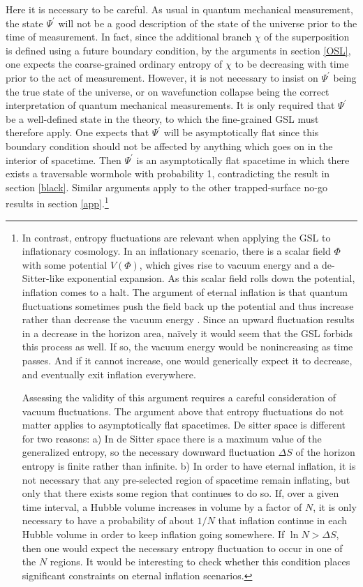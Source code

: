 \documentclass{article}
\begin{document}
Here it is necessary to be careful.  As usual in quantum mechanical measurement, the state $\Psi^\prime$ will not be a good description of the state of the universe prior to the time of measurement.  In fact, since the additional branch $\chi$ of the superposition is defined using a future boundary condition, by the arguments in section \ref{OSL}, one expects the coarse-grained ordinary entropy of $\chi$ to be decreasing with time prior to the act of measurement.  However, it is not necessary to insist on $\Psi^\prime$ being the true state of the universe, or on wavefunction collapse being the correct interpretation of quantum mechanical measurements.  It is only required that $\Psi^\prime$ be a well-defined state in the theory, to which the fine-grained GSL must therefore apply.  One expects that $\Psi^\prime$ will be asymptotically flat since this boundary condition should not be affected by anything which goes on in the interior of spacetime.  Then 
$\Psi^\prime$ is an asymptotically flat spacetime in which there exists a traversable wormhole with probability 1, contradicting the result in section \ref{black}.  Similar arguments apply to the other trapped-surface no-go results in section \ref{app}.\footnote{In contrast, entropy fluctuations are relevant when applying the GSL to inflationary cosmology.  In an inflationary scenario, there is a scalar field $\Phi$ with some potential $V(\Phi)$, which gives rise to vacuum energy and a de-Sitter-like exponential expansion.  As this scalar field rolls down the potential, inflation comes to a halt.  The argument of eternal inflation is that quantum fluctuations sometimes push the field back up the potential and thus increase rather than decrease the vacuum energy \cite{eternal}.  Since an upward fluctuation results in a decrease in the horizon area, na\"{i}vely it would seem that the GSL forbids this process as well.  If so, the vacuum energy would be nonincreasing as time passes.  And if it cannot increase, one would generically expect it to decrease, and eventually exit inflation everywhere.

Assessing the validity of this argument requires a careful consideration of vacuum fluctuations.  The argument above that entropy fluctuations do not matter applies to asymptotically flat spacetimes.  De sitter space is different for two reasons: a) In de Sitter space there is a maximum value of the generalized entropy, so the necessary downward fluctuation $\Delta S$ of the horizon entropy is finite rather than infinite. b) In order to have eternal inflation, it is not necessary that any pre-selected region of spacetime remain inflating, but only that there exists some region that continues to do so.  If, over a given time interval, a Hubble volume increases in volume by a factor of $N$, it is only necessary to have a probability of about $1/N$ that inflation continue in each Hubble volume in order to keep inflation going somewhere.  If $\ln N > \Delta S$, then one would expect the necessary entropy fluctuation to occur in one of the $N$ regions.  It would be interesting to check whether this condition places significant constraints on eternal inflation scenarios.\label{inflation}}
\end{document}
